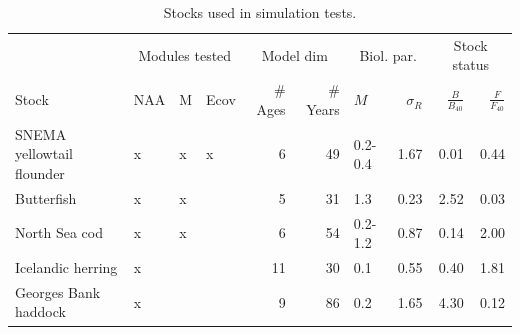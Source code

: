 \documentclass[]{article}
\begin{document}
\begin{table}

\caption{\label{tab:stock-list}Stocks used in simulation tests.}
\centering
\begin{tabular}[t]{llllrrlrrr}
\toprule
\multicolumn{1}{c}{ } & \multicolumn{3}{c}{Modules tested} & \multicolumn{2}{c}{Model dim} & \multicolumn{2}{c}{Biol. par.} & \multicolumn{2}{c}{Stock status} \\
\cmidrule(l{3pt}r{3pt}){2-4} \cmidrule(l{3pt}r{3pt}){5-6} \cmidrule(l{3pt}r{3pt}){7-8} \cmidrule(l{3pt}r{3pt}){9-10}
Stock & NAA & M & Ecov & \# Ages & \# Years & $M$ & $\sigma_R$ & $\frac{B}{B_{40}}$ & $\frac{F}{F_{40}}$\\
\midrule
SNEMA yellowtail flounder & x & x & x & 6 & 49 & 0.2-0.4 & 1.67 & 0.01 & 0.44\\
Butterfish & x & x &  & 5 & 31 & 1.3 & 0.23 & 2.52 & 0.03\\
North Sea cod & x & x &  & 6 & 54 & 0.2-1.2 & 0.87 & 0.14 & 2.00\\
Icelandic herring & x &  &  & 11 & 30 & 0.1 & 0.55 & 0.40 & 1.81\\
Georges Bank haddock & x &  &  & 9 & 86 & 0.2 & 1.65 & 4.30 & 0.12\\
\bottomrule
\end{tabular}
\end{table}

\clearpage

\end{document}
